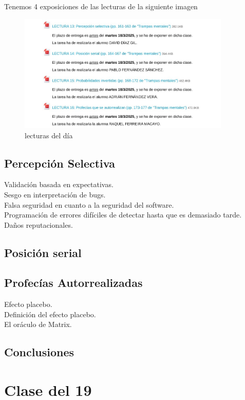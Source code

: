 \documentclass[12pt, a4paper, twoside]{article}
\begin{document}
Tenemos 4 exposiciones de las lecturas de la siguiente imagen
\begin{figure}[h]
    \centering
    \includegraphics[width=0.9\textwidth]{./Images/0318.jpg}
    \caption{lecturas del día}
\end{figure}
\subsection{Percepción Selectiva}
Validación basada en expectativas.\\
Sesgo en interpretación de bugs.\\
Falsa seguridad en cuanto a la seguridad del software.\\
Programación de errores difíciles de detectar hasta que es demasiado tarde.\\
Daños reputacionales.\\
\subsection{Posición serial}
\subsection{Profecías Autorrealizadas}
Efecto placebo.\\
Definición del efecto placebo.\\
El oráculo de Matrix.\\
\subsection{Conclusiones}


\section{Clase del 19}
\end{document}
